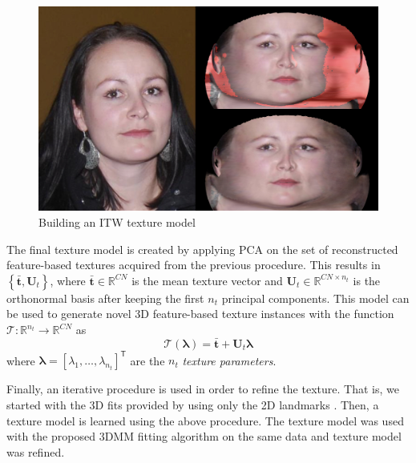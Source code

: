 \begin{figure}[!t]
    \centering
    \includegraphics[width=0.7\linewidth]{itw_extraction}
    \caption{Building an ITW texture model}
\label{fig:itw_extraction}
\end{figure}
The final texture model is created by applying PCA on the set of reconstructed
feature-based textures acquired from the previous procedure. This results in
$\left\lbrace\bar{\mathbf{t}}, \mathbf{U}_t\right\rbrace$,
where $\bar{\mathbf{t}}\in\mathbb{R}^{CN}$ is the mean texture vector and
$\mathbf{U}_t\in\mathbb{R}^{CN\times n_t}$ is the orthonormal basis after
keeping the first $n_t$ principal components. This model can be used to generate
novel 3D feature-based texture instances with the function
$\mathcal{T}: \mathbb{R}^{n_t} \rightarrow \mathbb{R}^{CN}$ as
%
\begin{equation}
\mathcal{T}(\boldsymbol{\lambda}) = \bar{\mathbf{t}} + \mathbf{U}_t \boldsymbol{\lambda}
\label{equ:texture_instance}
\end{equation}
%
where $\boldsymbol{\lambda}={[\lambda_1,\ldots,\lambda_{n_t}]}^\mathsf{T}$ are the $n_t$ \emph{texture parameters}.

Finally, an iterative procedure is used in order to refine the texture. That is, we started with the 3D fits provided by using only the 2D landmarks \cite{jourabloo2016large}. Then, a texture model is learned using the above procedure. The texture model was used with the proposed 3DMM fitting algorithm on the same data and texture model was refined.
